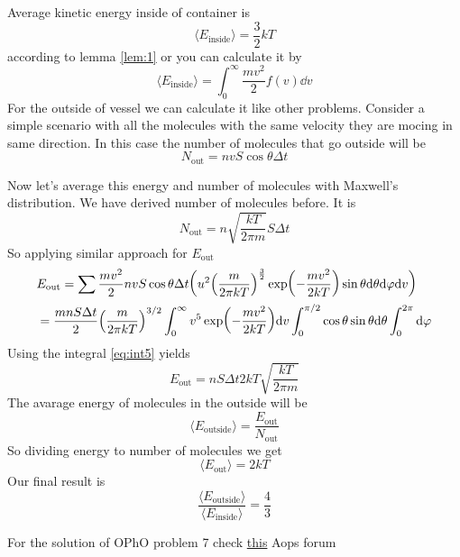 \documentclass[a4paper, 12pt]{article}
\begin{document}
\begin{sol}
    Average kinetic energy inside of container is $$\langle E_{\text{inside}}\rangle=\frac{3}{2}kT$$ according to lemma \ref{lem:1} or you can calculate it by 
    $$\langle E_{\text{inside}}\rangle=\int_0^\infty\frac{mv^2}{2}f(v)\dd v$$
    For the outside of vessel we can calculate it like other problems. Consider a simple scenario with all the molecules with the same velocity they are mocing in same direction.
    In this case the number of molecules that go outside will be $$N_{\text{out}}=nvS\cos\theta\Delta t$$

    Now let's average this energy and number of molecules with Maxwell's distribution. We have derived number of molecules before. It is
    $$N_{\text{out}}=n\sqrt{\frac{kT}{2\pi m}}S\Delta t$$
    So applying similar approach for $E_{\text{out}}$
    \begin{align*}
        &E_{\text{out}}=\sum \frac{mv^2}{2}nvS\cos\theta\Delta t\qty(u^2\qty(\frac{m}{2\pi kT})^{\frac{3}{2}}\exp(-\frac{mv^2}{2kT})\sin\theta\dd\theta\dd\varphi\dd v)\\
        &=\frac{mnS\Delta t}{2}\qty(\frac{m}{2\pi kT})^{3/2}\int_0^\infty v^5\exp(-\frac{mv^2}{2kT})\dd v\int_0^{\pi/2}\cos\theta\sin\theta\dd\theta\int_0^{2\pi}\dd\varphi
    \end{align*}
    Using the integral \ref{eq:int5} yields
    $$E_{\text{out}}=nS\Delta t2kT\sqrt{\frac{kT}{2\pi m}}$$
    The avarage energy of molecules in the outside will be $$\langle E_{\text{outside}}\rangle=\frac{E_{\text{out}}}{N_{\text{out}}}$$
    So dividing energy to number of molecules we get $$\langle E_{\text{out}}\rangle=2kT$$
    Our final result is $$\frac{\langle E_{\text{outside}}\rangle}{\langle E_{\text{inside}}\rangle}=\frac{4}{3}$$
\end{sol}
\begin{note}
    For the solution of OPhO problem 7 check \href{https://artofproblemsolving.com/community/c1222116_opho_invitational_round}{this} Aops forum 
\end{note}
\end{document}
